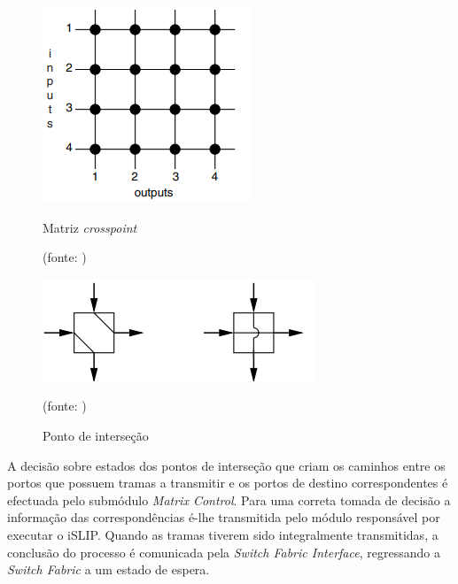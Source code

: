 \begin{figure}[H]
\centering
\begin{minipage}{.5\textwidth}
  \centering
  \includegraphics[width=.9\linewidth]{crossmatrix.png}
  \caption{Matriz \textit{crosspoint}}{(fonte: \cite{math})}
  \label{fig:test1}
\end{minipage}%
\begin{minipage}{.5\textwidth}
  \centering
  \includegraphics[width=.9\linewidth]{crosspoint.png}
  \caption{Ponto de interseção}{(fonte: \cite{math})}
  \label{fig:test2}
\end{minipage}
\end{figure}

A decisão sobre estados dos pontos de interseção que criam os caminhos entre os portos que possuem tramas a transmitir e os portos de destino correspondentes é efectuada pelo submódulo \textit{Matrix Control}. Para uma correta tomada de decisão a informação das correspondências é-lhe transmitida pelo módulo responsável por executar o iSLIP. 
Quando as tramas tiverem sido integralmente transmitidas, a conclusão do processo é comunicada pela \textit{Switch Fabric Interface}, regressando a \textit{Switch Fabric} a um estado de espera.  

